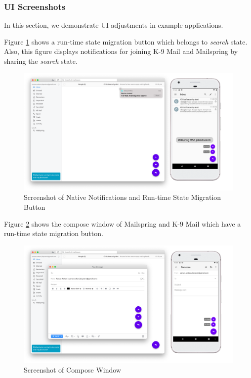\subsubsection{UI Screenshots}
In this section, we demonstrate UI adjustments in example applications.

Figure \ref{fig:adapt-noti} shows a run-time state migration button which belongs to \textit{search} state. Also, this figure displays notifications for joining K-9 Mail and Mailspring by sharing the \textit{search} state.


\FloatBarrier
\begin{figure}[H]
    \includegraphics[width=\linewidth]{../figures/adapt-noti.png}
    \centering
    \caption{Screenshot of Native Notifications and Run-time State Migration Button}
    \label{fig:adapt-noti}
\end{figure}
\FloatBarrier

Figure \ref{fig:adapt-compose} shows the compose window of Mailspring and K-9 Mail which have a run-time state migration button.

\FloatBarrier
\begin{figure}[H]
    \includegraphics[width=\linewidth]{../figures/adapt-compose.png}
    \centering
    \caption{Screenshot of Compose Window}
    \label{fig:adapt-compose}
\end{figure}
\FloatBarrier

